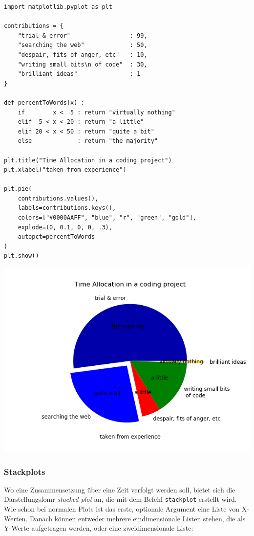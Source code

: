 \begin{codebox}
\begin{verbatim}
import matplotlib.pyplot as plt

contributions = {
    "trial & error"                 : 99,
    "searching the web"             : 50,
    "despair, fits of anger, etc"   : 10,
    "writing small bits\n of code"  : 30,
    "brilliant ideas"               : 1
}

def percentToWords(x) :
    if        x <  5 : return "virtually nothing"
    elif  5 < x < 20 : return "a little"
    elif 20 < x < 50 : return "quite a bit"
    else             : return "the majority"

plt.title("Time Allocation in a coding project")
plt.xlabel("taken from experience")

plt.pie(
    contributions.values(),
    labels=contributions.keys(),
    colors=["#0000AAFF", "blue", "r", "green", "gold"],
    explode=(0, 0.1, 0, 0, .3),
    autopct=percentToWords
)
plt.show()
\end{verbatim}
\end{codebox}
%
\begin{tcolorbox}[title=Ausgabe: Verändertes Kuchendiagramm]
\begin{center}
	\includegraphics[width=.68\linewidth]{./gfx/plt-pie-args}
\end{center}
\end{tcolorbox}

\subsubsection{Stackplots}
Wo eine Zusammensetzung über eine Zeit verfolgt werden soll, bietet sich die Darstellungsfomr \emph{stacked plot} an, die mit dem Befehl \texttt{stackplot} erstellt wird. Wie schon bei normalen Plots ist das erste, optionale Argument eine Liste von X-Werten. Danach können entweder mehrere eindimensionale Listen stehen, die als Y-Werte aufgetragen werden, oder eine zweidimensionale Liste:

